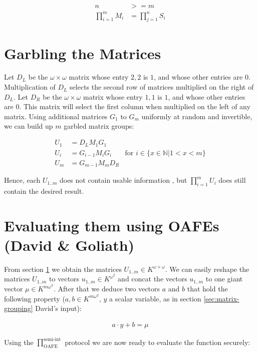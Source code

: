 \documentclass[12pt, a4paper]{article}
\begin{document}
\begin{align*}
n & >= m \\
\prod_{i=1}^m M_i & = \prod_{j=1}^n S_i
\end{align*}

\section{Garbling the Matrices}
\label{sec:matrix-garbling}

Let $D_L$ be the $\omega \times \omega$ matrix whose entry $2,2$ is $1$, and
whose other entries are $0$. Multiplication of $D_L$ selects the second row of
matrices multiplied on the right of $D_L$. Let $D_R$ be the $\omega \times
\omega$ matrix whose entry $1,1$ is $1$, and whose other entries are $0$. This
matrix will select the first column when multiplied on the left of any matrix.
Using additional matrices $G_1$ to $G_{m}$ uniformly at random and invertible,
we can build up $m$ garbled matrix groups:

\begin{align*}
U_1 & = D_L M_1 G_1 \\
U_i & = G_{i-1} M_i G_i & \text{for $i \in \{x \in \mathbb{N} \big| 1 < x < m\}$}\\
U_m & = G_{m-1} M_m D_R
\end{align*}

\noindent{} Hence, each $U_{1..m}$ does not contain usable information
\cite{cramer03}, but $\prod_{i=1}^m U_i$ does still contain the desired result.


\section{Evaluating them using OAFEs (David \& Goliath)}

From section \ref{sec:matrix-garbling} we obtain the matrices $U_{1..m} \in
K^{\omega \times \omega}$. We can easily reshape the matrices $U_{1..m}$ to
vectors $u_{1..m} \in K^{\omega^2}$ and concat the vectors $u_{1..m}$ to one
giant vector $\mu \in K^{m\omega^2}$. After that we deduce two vectors $a$ and
$b$ that hold the following property ($a, b \in K^{m\omega^2}$, $y$ a scalar
variable, as in section \ref{sec:matrix-grouping} David's input):

\begin{align}
a \cdot y + b = \mu
\end{align}

Using the $\prod^{\text{semi-int}}_{\text{OAFE}}$ protocol\cite{davidgoliath} we
are now ready to evaluate the function securely:
\end{document}
